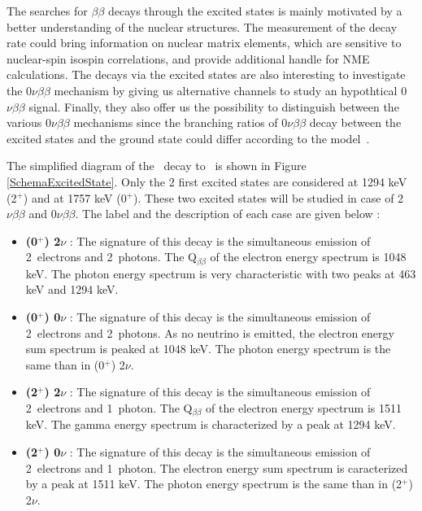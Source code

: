 \documentclass[main.tex]{subfiles}
\begin{document}
\bigskip


\NI The searches for $\beta \beta$ decays through the excited states is mainly motivated by a better understanding of the nuclear structures. The measurement of the decay rate could bring information on nuclear matrix elements, which are sensitive to nuclear-spin isospin correlations, and provide additional handle for NME calculations. The decays via the excited states are also interesting to investigate the 0$\nu\beta\beta$ mechanism by giving us alternative channels to study an hypothtical 0$\nu\beta\beta$ signal. Finally, they also offer us the possibility to distinguish between the various 0$\nu\beta\beta$ mechanisms since the branching ratios of 0$\nu\beta\beta$ decay between the excited states and the ground state could differ according to the model~\cite{TheoryOfNeutrinolessDBD}.


\bigskip


\NI The simplified diagram of the \Cd~decay to \Sn~is shown in Figure \ref{SchemaExcitedState}. Only the 2 first excited states are considered at 1294 keV (2$^+$) and at 1757 keV (0$^+$). These two excited states will be studied in case of 2$\nu\beta\beta$ and 0$\nu\beta\beta$. The label and the description of each case are given below :



\begin{itemize}
\item \textbf{(0$^+$) 2$\nu$} : The signature of this decay is the simultaneous emission of 2~electrons and 2~photons. The Q$_{\beta \beta}$ of the electron energy spectrum is 1048 keV. The photon energy spectrum is very characteristic with two peaks at 463 keV and 1294 keV.

\item \textbf{(0$^+$) 0$\nu$} : The signature of this decay is the simultaneous emission of 2~electrons and 2~photons. As no neutrino is emitted, the electron energy sum spectrum is peaked at 1048 keV. The photon energy spectrum is the same than in (0$^+$) 2$\nu$.

\item \textbf{(2$^+$) 2$\nu$} : The signature of this decay is the simultaneous emission of 2~electrons and 1~photon. The Q$_{\beta \beta}$ of the electron energy spectrum is 1511 keV. The gamma energy spectrum is characterized by a peak at 1294 keV.

\item \textbf{(2$^+$) 0$\nu$} : The signature of this decay is the simultaneous emission of 2~electrons and 1~photon. The electron energy sum spectrum is caracterized by a peak at 1511 keV. The photon energy spectrum is the same than in (2$^+$) 2$\nu$.
\end{itemize}
\end{document}
